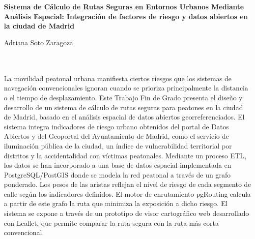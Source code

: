 \chapter*{}
\thispagestyle{empty}





\cleardoublepage
\thispagestyle{empty}

\begin{center}
{\large\bfseries Sistema de Cálculo de Rutas Seguras en Entornos Urbanos Mediante Análisis Espacial: Integración de factores de riesgo y datos abiertos en la ciudad de Madrid}\\
\end{center}
\begin{center}
Adriana Soto Zaragoza\\
\end{center}

\\

\vspace{0.7cm}
\\

La movilidad peatonal urbana manifiesta ciertos riesgos que los sistemas de navegación convencionales ignoran cuando se prioriza principalmente la distancia o el tiempo de desplazamiento. Este Trabajo Fin de Grado presenta el diseño y desarrollo de un sistema de cálculo de rutas seguras para peatones en la ciudad de Madrid, basado en el análisis espacial de datos abiertos georreferenciados. El sistema integra indicadores de riesgo urbano obtenidos del portal de Datos Abiertos y del Geoportal del Ayuntamiento de Madrid, como el servicio de iluminación pública de la ciudad, un índice de vulnerabilidad territorial por distritos y la accidentalidad con víctimas peatonales. Mediante un proceso ETL, los datos se han incorporado a una base de datos espacial implementada en PostgreSQL/PostGIS donde se modela la red peatonal a través de un grafo ponderado. Los pesos de las aristas reflejan el nivel de riesgo de cada segmento de calle según los indicadores definidos. El motor de enrutamiento pgRouting calcula a partir de este grafo la ruta que minimiza la exposición a dicho riesgo. El sistema se expone a través de un prototipo de visor cartográfico web desarrollado con Leaflet, que permite comparar la ruta segura con la ruta más corta convencional.
\cleardoublepage


